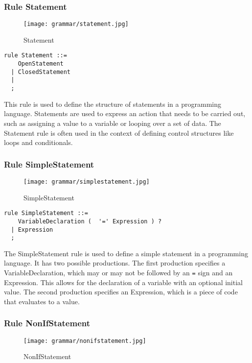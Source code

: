 \subsubsection*{Rule Statement}

\begin{figure}
\centering
\texttt{[image: grammar/statement.jpg]}
\caption{Statement}
\end{figure}

\begin{lstlisting}
rule Statement ::=
    OpenStatement 
  | ClosedStatement 
  | 
  ;
\end{lstlisting}

This rule is used to define the structure of statements in a programming language. Statements are used to express an action that needs to be carried out, such as assigning a value to a variable or looping over a set of data. The Statement rule is often used in the context of defining control structures like loops and conditionals.

\subsubsection*{Rule SimpleStatement}

\begin{figure}
  \centering
  \texttt{[image: grammar/simplestatement.jpg]}
  \caption{SimpleStatement}
  \end{figure}

\begin{lstlisting}
rule SimpleStatement ::=
    VariableDeclaration (  '=' Expression ) ?  
  | Expression 
  ;
\end{lstlisting}

The SimpleStatement rule is used to define a simple statement in a programming language. It has two possible productions. The first production specifies a VariableDeclaration, which may or may not be followed by an \verb|=| sign and an Expression. This allows for the declaration of a variable with an optional initial value. The second production specifies an Expression, which is a piece of code that evaluates to a value.

\subsubsection*{Rule NonIfStatement}

\begin{figure}
  \centering
  \texttt{[image: grammar/nonifstatement.jpg]}
  \caption{NonIfStatement}
  \end{figure}

